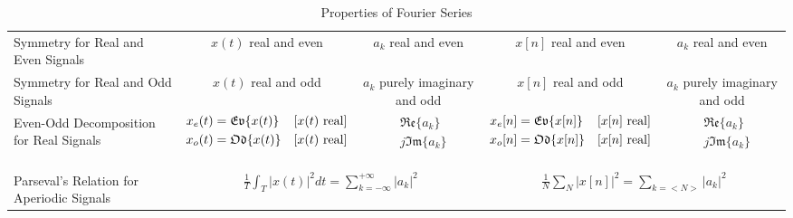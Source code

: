 \documentclass[landscape,a4paper]{article}
\begin{document}
\begin{table}[htbp]
\begin{tabular}{p{12em}<{\centering}cccc}
Symmetry for Real and Even Signals & $x(t)$ real and even & $a_k$ real and even 
& $x[n]$ real and even & $a_k$ real and even \\

Symmetry for Real and Odd Signals & $x(t)$ real and odd & $a_k$ purely imaginary and odd 
& $x[n]$ real and odd & $a_k$ purely imaginary and odd \\

Even-Odd Decomposition for Real Signals & 
$\begin{aligned}
x_e(t)&=\mathfrak{Ev}\{x(t)\} & [x(t){\rm\ real}] \\
x_o(t)&=\mathfrak{Od}\{x(t)\} & [x(t){\rm\ real}] \\
\end{aligned}$ & 
$\begin{aligned}
&\mathfrak{Re}\{a_k\} \\
&j\mathfrak{Im}\{a_k\} \\
\end{aligned}$ &
$\begin{aligned}
x_e[n]&=\mathfrak{Ev}\{x[n]\} & [x[n]{\rm\ real}] \\
x_o[n]&=\mathfrak{Od}\{x[n]\} & [x[n]{\rm\ real}] \\
\end{aligned}$ & 
$\begin{aligned}
&\mathfrak{Re}\{a_k\} \\
&j\mathfrak{Im}\{a_k\} \\
\end{aligned}$ \\
& \\
\hdashline
& \\
Parseval's Relation for Aperiodic Signals 
& \multicolumn{2}{c}{$\displaystyle\frac{1}{T}\int_T|x(t)|^2dt=\sum_{k=-\infty}^{+\infty}|a_k|^2$}
& \multicolumn{2}{c}{$\displaystyle\frac{1}{N}\sum_N|x[n]|^2=\sum_{k=<N>}|a_k|^2$} \\
\hline
\end{tabular}
\caption{Properties of Fourier Series}
\end{table}

\newpage
\end{document}
